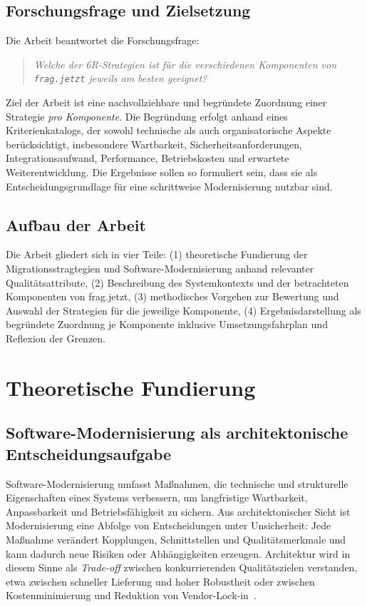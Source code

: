 \subsection{Forschungsfrage und Zielsetzung}

Die Arbeit beantwortet die Forschungsfrage:
\begin{quote}
\emph{Welche der 6R-Strategien ist für die verschiedenen Komponenten von \texttt{frag.jetzt} jeweils am besten geeignet?}
\end{quote}
Ziel der Arbeit ist eine nachvollziehbare und begründete Zuordnung einer Strategie \emph{pro Komponente}.
Die Begründung erfolgt anhand eines Kriterienkatalogs, der sowohl technische als auch organisatorische Aspekte berücksichtigt, insbesondere Wartbarkeit,
Sicherheitsanforderungen, Integrationsaufwand, Performance, Betriebskosten und erwartete Weiterentwicklung. 
Die Ergebnisse sollen so formuliert sein, dass sie als Entscheidungsgrundlage für eine schrittweise Modernisierung nutzbar sind.

\subsection{Aufbau der Arbeit}

Die Arbeit gliedert sich in vier Teile: 
(1) theoretische Fundierung der Migrationsstragtegien und Software-Modernisierung anhand relevanter Qualitätsattribute,
(2) Beschreibung des Systemkontexts und der betrachteten Komponenten von frag.jetzt, 
(3) methodisches Vorgehen zur Bewertung und Auswahl der Strategien für die jeweilige Komponente,
(4) Ergebnisdarstellung als begründete Zuordnung je Komponente inklusive Umsetzungsfahrplan und Reflexion der Grenzen.

\section{Theoretische Fundierung}
\subsection{Software-Modernisierung als architektonische Entscheidungsaufgabe}

Software-Modernisierung umfasst Maßnahmen, die technische und strukturelle Eigenschaften eines Systems verbessern, um langfristige Wartbarkeit, Anpassbarkeit und 
Betriebsfähigkeit zu sichern. Aus architektonischer Sicht ist Modernisierung eine Abfolge von Entscheidungen unter Unsicherheit: Jede Maßnahme verändert Kopplungen, 
Schnittstellen und Qualitätsmerkmale und kann dadurch neue Risiken oder Abhängigkeiten erzeugen. Architektur wird in diesem Sinne als \emph{Trade-off} zwischen konkurrierenden 
Qualitätszielen verstanden, etwa zwischen schneller Lieferung und hoher Robustheit oder zwischen Kostenminimierung und Reduktion von Vendor-Lock-in~\cite{richards2020fundamentals,ford2021hardparts}.

